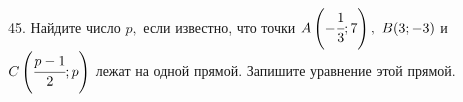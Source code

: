 45. Найдите число $p,$ если известно, что точки $A\left(-\cfrac{1}{3};7\right),\ B(3;-3)$ и $C\left(\cfrac{p-1}{2}; p\right)$ лежат на одной прямой. Запишите уравнение этой прямой.\\
